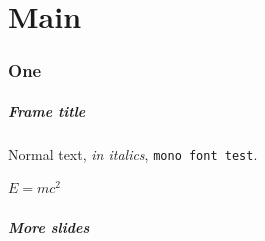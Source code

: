 \documentclass[nonavigation]{taltechslides}
\begin{document}
\maketitle

\part{Main}

\section{One}

\begin{frame}[fragile]
    \frametitle{Frame title}

    Normal text, \textit{in italics}, \texttt{mono font test}.

    \(E=mc^2\)

\end{frame}


{%
    \beamertemplatenavigationsymbolsempty
    \begin{frame}[plain]\end{frame}
}

\begin{frame}[fragile]
    \frametitle{More slides}

    

\end{frame}
\end{document}

